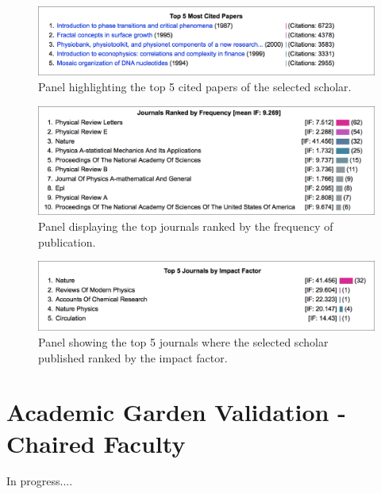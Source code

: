 \begin{figure}[H]
    \centering
    \includegraphics[width=\textwidth]{figures/fig_panel3-N}
    \caption{Panel highlighting the top 5 cited papers of the selected scholar.}
    \label{fig:panel3}
\end{figure}

\begin{figure}[H]
    \centering
    \includegraphics[width=\textwidth]{figures/fig_panel2-N}
    \caption{Panel displaying the top journals ranked by the frequency of publication.}
    \label{fig:panel2}
\end{figure}

\begin{figure}[H]
    \centering
    \includegraphics[width=\textwidth]{figures/fig_panel4-N}
    \caption{Panel showing the top 5 journals where the selected scholar published ranked by the impact factor.}
    \label{fig:panel4}
\end{figure}






\section{Academic Garden Validation - Chaired Faculty }

In progress....






